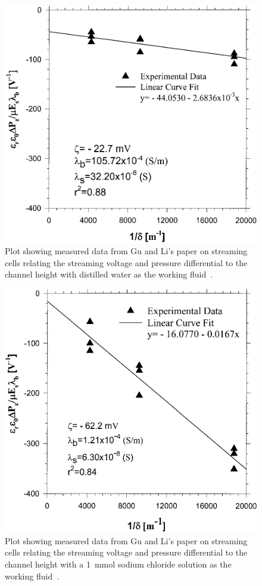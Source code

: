   \begin{figure}
      \centering
      \includegraphics{content/pt1/01-PowerHarvesting/graphics/GuLi_DIUF}
      \caption{\label{fig:Gu_Li_comparison_DUIF}Plot showing measured data from Gu and Li's paper on streaming cells relating the streaming voltage and pressure differential to the channel height with distilled water as the working fluid~\cite{Gu2000}.}
  \end{figure}

  \begin{figure}
      \centering
      \includegraphics{content/pt1/01-PowerHarvesting/graphics/GuLi_NaCl}
      \caption{\label{fig:Gu_Li_comparison_NaCl}Plot showing measured data from Gu and Li's paper on streaming cells relating the streaming voltage and pressure differential to the channel height with a \SI{1}{\milli\mole} sodium chloride solution as the working fluid~\cite{Gu2000}.}
  \end{figure}

